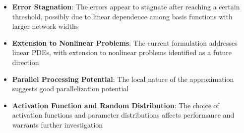 \documentclass[11pt,a4paper]{article}
\begin{document}
\begin{itemize}
    \item \textbf{Error Stagnation}: The errors appear to stagnate after reaching a certain threshold, possibly due to linear dependence among basis functions with larger network widths
    
    \item \textbf{Extension to Nonlinear Problems}: The current formulation addresses linear PDEs, with extension to nonlinear problems identified as a future direction
    
    \item \textbf{Parallel Processing Potential}: The local nature of the approximation suggests good parallelization potential
    
    \item \textbf{Activation Function and Random Distribution}: The choice of activation functions and parameter distributions affects performance and warrants further investigation
\end{itemize}
\end{document}
